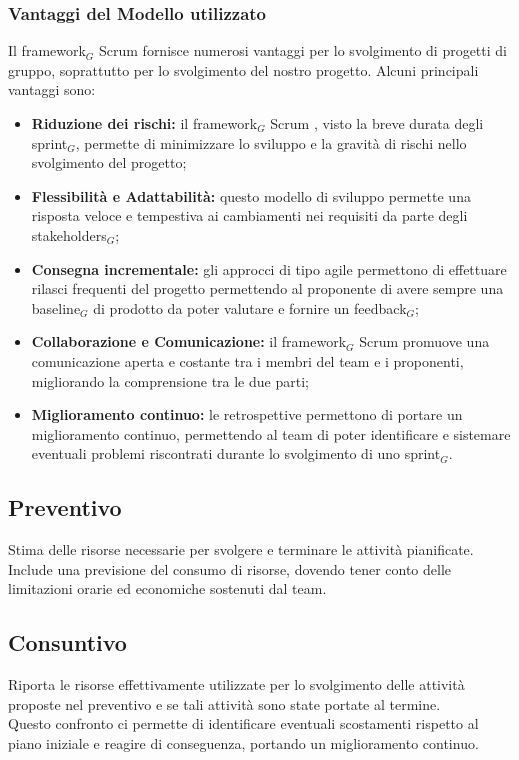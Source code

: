 \documentclass[10pt]{article}
\begin{document}
{\subsubsection{Vantaggi del Modello utilizzato}
Il framework$_G$ Scrum fornisce numerosi vantaggi per lo svolgimento di progetti di gruppo, soprattutto per lo svolgimento del nostro progetto. Alcuni principali vantaggi sono:
\begin{itemize}
  \item \textbf{Riduzione dei rischi:} il framework$_G$ Scrum , visto la breve durata degli sprint$_G$, permette di minimizzare lo sviluppo e la gravità di rischi nello svolgimento del progetto;
  \item \textbf{Flessibilità e Adattabilità:} questo modello di sviluppo permette una risposta veloce e tempestiva ai cambiamenti nei requisiti da parte degli stakeholders$_G$;
  \item \textbf{Consegna incrementale:} gli approcci di tipo agile permettono di effettuare rilasci frequenti del progetto permettendo al proponente di avere sempre una baseline$_G$ di prodotto da poter valutare e fornire un feedback$_G$;
  \item \textbf{Collaborazione e Comunicazione:} il framework$_G$ Scrum promuove una comunicazione aperta e costante tra i membri del team e i proponenti, migliorando la comprensione tra le due parti;
  \item \textbf{Miglioramento continuo:} le retrospettive permettono di portare un miglioramento continuo, permettendo al team di poter identificare e sistemare eventuali problemi riscontrati durante lo svolgimento di uno sprint$_G$.
\end{itemize}

\subsection{Preventivo}
Stima delle risorse necessarie per svolgere e terminare le attività pianificate. Include una previsione del consumo di risorse, dovendo tener conto delle limitazioni orarie ed economiche sostenuti dal team.
\subsection{Consuntivo}
Riporta le risorse effettivamente utilizzate per lo svolgimento delle attività proposte nel preventivo e se tali attività sono state portate al termine.\\
Questo confronto ci permette di identificare eventuali scostamenti rispetto al piano iniziale e reagire di conseguenza, portando un miglioramento continuo.
\newpage
}
\end{document}
